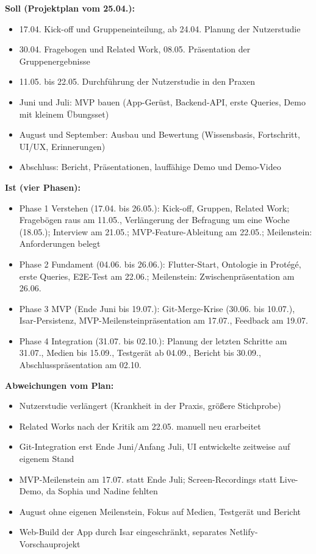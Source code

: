 \textbf{Soll (Projektplan vom 25.04.):}
\begin{itemize}
    \item 17.04. Kick-off und Gruppeneinteilung, ab 24.04. Planung der Nutzerstudie
    \item 30.04. Fragebogen und Related Work, 08.05. Präsentation der Gruppenergebnisse
    \item 11.05. bis 22.05. Durchführung der Nutzerstudie in den Praxen
    \item Juni und Juli: MVP bauen (App-Gerüst, Backend-API, erste Queries, Demo mit kleinem Übungsset)
    \item August und September: Ausbau und Bewertung (Wissensbasis, Fortschritt, UI/UX, Erinnerungen)
    \item Abschluss: Bericht, Präsentationen, lauffähige Demo und Demo-Video
\end{itemize}

\textbf{Ist (vier Phasen):}
\begin{itemize}
    \item Phase 1 Verstehen (17.04. bis 26.05.): Kick-off, Gruppen, Related Work; Fragebögen raus am 11.05., Verlängerung der Befragung um eine Woche (18.05.); Interview am 21.05.; MVP-Feature-Ableitung am 22.05.; Meilenstein: Anforderungen belegt
    \item Phase 2 Fundament (04.06. bis 26.06.): Flutter-Start, Ontologie in Protégé, erste Queries, E2E-Test am 22.06.; Meilenstein: Zwischenpräsentation am 26.06.
    \item Phase 3 MVP (Ende Juni bis 19.07.): Git-Merge-Krise (30.06. bis 10.07.), Isar-Persistenz, MVP-Meilensteinpräsentation am 17.07., Feedback am 19.07.
    \item Phase 4 Integration (31.07. bis 02.10.): Planung der letzten Schritte am 31.07., Medien bis 15.09., Testgerät ab 04.09., Bericht bis 30.09., Abschlusspräsentation am 02.10.
\end{itemize}

\textbf{Abweichungen vom Plan:}
\begin{itemize}
    \item Nutzerstudie verlängert (Krankheit in der Praxis, größere Stichprobe)
    \item Related Works nach der Kritik am 22.05. manuell neu erarbeitet
    \item Git-Integration erst Ende Juni/Anfang Juli, UI entwickelte zeitweise auf eigenem Stand
    \item MVP-Meilenstein am 17.07. statt Ende Juli; Screen-Recordings statt Live-Demo, da Sophia und Nadine fehlten
    \item August ohne eigenen Meilenstein, Fokus auf Medien, Testgerät und Bericht
    \item Web-Build der App durch Isar eingeschränkt, separates Netlify-Vorschauprojekt
\end{itemize}

